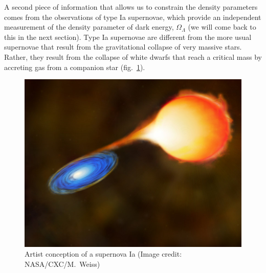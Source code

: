 \documentclass[11pt, a4paper,oneside,openright]{book}
\numberwithin{equation}{section}
\begin{document}
A second piece of information that allows us to constrain the density parameters comes from the observations of type Ia supernovae, which provide an independent measurement of the density parameter of dark energy, $\Omega_{\Lambda}$ (we will come back to this in the next section). Type Ia supernovae are different from the more usual supernovae that result from the gravitational collapse of very massive stars. Rather, they result from the collapse of white dwarfs that reach a critical mass by accreting gas from a companion star (fig.\ \ref{fig:lec10_3}).
\begin{figure}[ht]
\begin{center}
\includegraphics[scale=0.3]{Draw/lec10_3.png}
\end{center}
\caption{Artist conception of a supernova Ia (Image credit: NASA/CXC/M.\ Weiss)}
\label{fig:lec10_3}
\end{figure}
\end{document}
